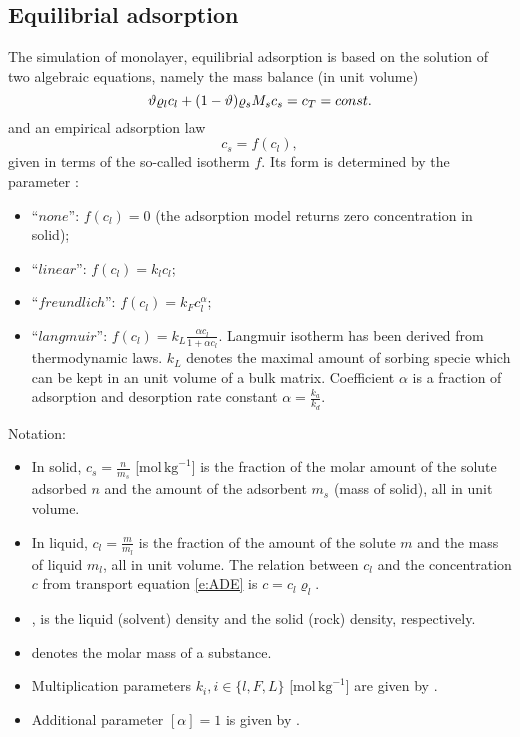 \subsection{Equilibrial adsorption}
\label{sec:sorp_math}

The simulation of monolayer, equilibrial adsorption is based on the solution of two algebraic equations, namely the mass balance (in unit volume)
\begin{equation}
\label{eq:mass_balance_sorption}
\th \varrho_l c_l + (1-\th) \varrho_s M_s c_s = c_T = const.
\end{equation}
and an empirical adsorption law
\begin{equation}
\label{eq:relation_cs_cl}
c_s = f(c_l),
\end{equation}
given in terms of the so-called isotherm $f$.
Its form is determined by the parameter :
\begin{itemize}
 \item ``$none$'': $f(c_l)=0$ (the adsorption model returns zero concentration in solid);
 \item ``$linear$'': $f(c_l) = k_l c_l$;
 \item ``$freundlich$'': $f(c_l) = k_F c_l^{\alpha}$;
 \item ``$langmuir$'': $f(c_l) = k_L \frac{\alpha c_l}{1 + \alpha c_l}$.
       Langmuir isotherm has been derived from thermodynamic laws. $k_L$ denotes the maximal amount 
       of sorbing specie which can be kept in an unit volume of a bulk matrix. Coefficient $\alpha$ is 
       a fraction of adsorption and desorption rate constant $\alpha = \frac{k_a}{k_d}$.
\end{itemize}

Notation:
\begin{itemize}
 \item In solid, $c_s = \frac{n}{m_s}$ [mol\,$\mathrm{kg}^{-1}$] is the fraction of the molar amount of the solute 
       adsorbed $n$ and the amount of the adsorbent $m_s$ (mass of solid), all in unit volume.
 \item In liquid, $c_l = \frac{m}{m_l}$ \units{}{}{} is the fraction of the amount of the solute $m$ and 
       the mass of liquid $m_l$, all in unit volume. The relation between $c_l$ and the concentration $c$ from 
       transport equation \eqref{e:ADE} is $c = c_l \varrho_l$.
 \item {},  is the liquid (solvent) density and the solid (rock) density, respectively.
 \item {} denotes the molar mass of a substance.
 \item Multiplication parameters $k_i, i\in\{ l,F,L\}$ [mol\,$\mathrm{kg}^{-1}$] are given by 
       .
 \item Additional parameter $[\alpha] = 1$ is given by .
\end{itemize}

